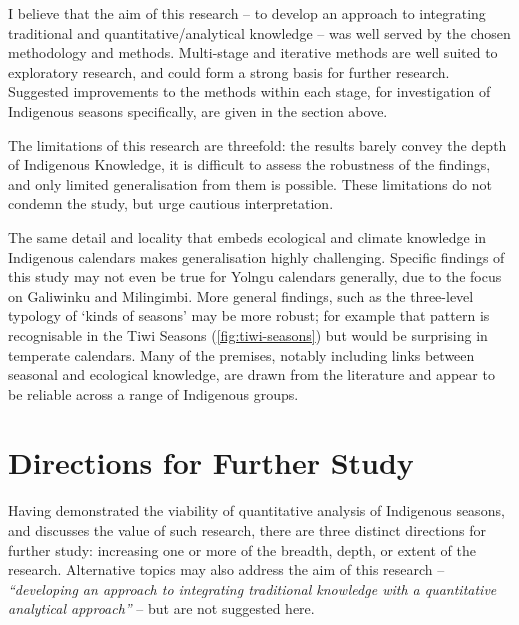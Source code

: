 I believe that the aim of this research -- to develop an approach to
integrating traditional and quantitative/analytical knowledge -- was well
served by the chosen methodology and methods.  Multi-stage and iterative
methods are well suited to exploratory research, and could form a strong
basis for further research.  Suggested improvements to the methods within
each stage, for investigation of Indigenous seasons specifically, are given
in the section above.



The limitations of this research are threefold:  the results barely convey
the depth of Indigenous Knowledge, it is difficult to assess the robustness
of the findings, and only limited generalisation from them is possible.  These
limitations do not condemn the study, but urge cautious interpretation.





The same detail and locality that embeds ecological and climate knowledge in
Indigenous calendars makes generalisation highly challenging.  Specific
findings of this study may not even be true for Yolngu calendars generally,
due to the focus on Galiwinku and Milingimbi.  More general findings, such as
the three-level typology of `kinds of seasons' may be more robust; for example
that pattern is recognisable in the Tiwi Seasons (\cref{fig:tiwi-seasons})
but would be surprising in temperate calendars.  Many of the premises, notably
including links between seasonal and ecological knowledge, are drawn from the
literature and appear to be reliable across a range of Indigenous groups.



\section{Directions for Further Study}
\label{sec:further-study}

Having demonstrated the viability of quantitative analysis of Indigenous
seasons, and discusses the value of such research, there are three distinct
directions for further study:  increasing one or more of the breadth, depth,
or extent of the research.  Alternative topics may also address the aim
of this research -- \textit{``developing an approach to integrating traditional
knowledge with a quantitative analytical approach''} -- but are not suggested
here.

